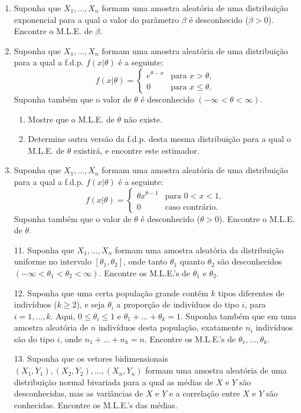 \begin{enumerate}
    \item Suponha que $X_1, \dots, X_n$ formam uma amostra aleatória de uma distribuição exponencial para a qual o valor do parâmetro $\beta$ é desconhecido ($\beta > 0$). Encontre o M.L.E. de $\beta$.

    \item Suponha que $X_1, \dots, X_n$ formam uma amostra aleatória de uma distribuição para a qual a f.d.p. $f(x|\theta)$ é a seguinte:
    $$ f(x|\theta) = \begin{cases} e^{\theta - x} & \text{para } x > \theta, \\ 0 & \text{para } x \le \theta. \end{cases} $$
    Suponha também que o valor de $\theta$ é desconhecido $(-\infty < \theta < \infty)$.
    \begin{enumerate}
        \item Mostre que o M.L.E. de $\theta$ não existe.
        \item Determine outra versão da f.d.p. desta mesma distribuição para a qual o M.L.E. de $\theta$ existirá, e encontre este estimador.
    \end{enumerate}

    \item Suponha que $X_1, \dots, X_n$ formam uma amostra aleatória de uma distribuição para a qual a f.d.p. $f(x|\theta)$ é a seguinte:
    $$ f(x|\theta) = \begin{cases} \theta x^{\theta-1} & \text{para } 0 < x < 1, \\ 0 & \text{caso contrário}. \end{cases} $$
    Suponha também que o valor de $\theta$ é desconhecido ($\theta > 0$). Encontre o M.L.E. de $\theta$.
    
    \item[11.] Suponha que $X_1, \dots, X_n$ formam uma amostra aleatória da distribuição uniforme no intervalo $[\theta_1, \theta_2]$, onde tanto $\theta_1$ quanto $\theta_2$ são desconhecidos $(-\infty < \theta_1 < \theta_2 < \infty)$. Encontre os M.L.E.'s de $\theta_1$ e $\theta_2$.

    \item[12.] Suponha que uma certa população grande contém $k$ tipos diferentes de indivíduos ($k \ge 2$), e seja $\theta_i$ a proporção de indivíduos do tipo $i$, para $i=1, \dots, k$. Aqui, $0 \le \theta_i \le 1$ e $\theta_1 + \dots + \theta_k = 1$. Suponha também que em uma amostra aleatória de $n$ indivíduos desta população, exatamente $n_i$ indivíduos são do tipo $i$, onde $n_1 + \dots + n_k = n$. Encontre os M.L.E.'s de $\theta_1, \dots, \theta_k$.

    \item[13.] Suponha que os vetores bidimensionais $(X_1, Y_1), (X_2, Y_2), \dots, (X_n, Y_n)$ formam uma amostra aleatória de uma distribuição normal bivariada para a qual as médias de $X$ e $Y$ são desconhecidas, mas as variâncias de $X$ e $Y$ e a correlação entre $X$ e $Y$ são conhecidas. Encontre os M.L.E.'s das médias.
\end{enumerate}